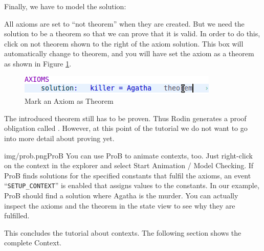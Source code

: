 Finally, we have to model the solution:


All axioms are set to ``not theorem'' when they are created. But we need the solution to be a theorem so that we can prove that it is valid. In order to do this, click on \textsf{not theorem} shown to the right of the axiom \textsf{solution}. This box will automatically change to \textsf{theorem}, and you will have set the axiom as a theorem as shown in Figure \ref{fig_tut_05_mark_theorem}.

\begin{figure}[h!t]
\begin{center}
	\includegraphics{img/tutorial/tut_05_agatha3_neweditor.png}
	\caption{Mark an Axiom as Theorem}
	\label{fig_tut_05_mark_theorem}
\end{center}
\end{figure}


The introduced theorem still has to be proven.
Thus Rodin generates a proof obligation called .
However, at this point of the tutorial we do not want to go into more detail about proving yet.

\begin{rodin-plugin}{img/prob.png}{ProB}%
  You can use ProB to animate contexts, too. Just right-click on the context in the explorer and select \textsf{Start Animation / Model Checking}. If ProB finds solutions for the specified constants that fulfil the axioms, an event ``\texttt{SETUP\_CONTEXT}'' is enabled that assigns values to the constants. In our example, ProB should find a solution where Agatha is the murder. You can actually inspect the axioms and the theorem in the state view to see why they are fulfilled.
\end{rodin-plugin}

This concludes the tutorial about contexts. The following section shows the complete Context.

